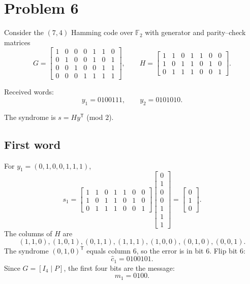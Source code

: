 \section*{Problem 6}

Consider the \((7,4)\) Hamming code over \(\mathbb{F}_2\) with generator and
parity–check matrices
\[
G =
\begin{bmatrix}
1 & 0 & 0 & 0 & 1 & 1 & 0\\
0 & 1 & 0 & 0 & 1 & 0 & 1\\
0 & 0 & 1 & 0 & 0 & 1 & 1\\
0 & 0 & 0 & 1 & 1 & 1 & 1
\end{bmatrix},
\qquad
H =
\begin{bmatrix}
1 & 1 & 0 & 1 & 1 & 0 & 0\\
1 & 0 & 1 & 1 & 0 & 1 & 0\\
0 & 1 & 1 & 1 & 0 & 0 & 1
\end{bmatrix}.
\]

Received words:
\[
y_1 = 0100111,\qquad y_2 = 0101010.
\]

The syndrome is \(s = H y^{\mathsf T}\) (mod \(2\)).

\subsection*{First word}

For \(y_1 = (0,1,0,0,1,1,1)\),
\[
s_1 =
\begin{bmatrix}
1 & 1 & 0 & 1 & 1 & 0 & 0\\
1 & 0 & 1 & 1 & 0 & 1 & 0\\
0 & 1 & 1 & 1 & 0 & 0 & 1
\end{bmatrix}
\begin{bmatrix}0\\1\\0\\0\\1\\1\\1\end{bmatrix}
=
\begin{bmatrix}0\\1\\0\end{bmatrix}.
\]
The columns of \(H\) are
\[
(1,1,0),(1,0,1),(0,1,1),(1,1,1),(1,0,0),(0,1,0),(0,0,1).
\]
The syndrome \((0,1,0)^{\mathsf T}\) equals column \(6\), so the error is in bit \(6\).
Flip bit \(6\):
\[
\hat c_1 = 0100101.
\]
Since \(G=[I_4\mid P]\), the first four bits are the message:
\[
m_1 = 0100.
\]

